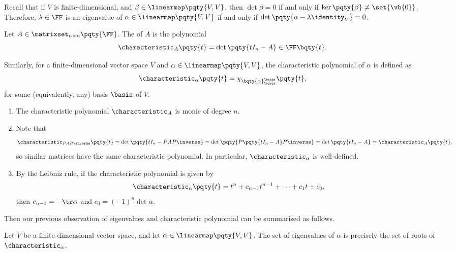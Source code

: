 Recall that if \(V\) is finite-dimensional, and \(\beta \in \linearmap\pqty{V, V}\), then \(\det \beta = 0\) if and only if \(\ker \pqty{\beta} \neq \set{\vb{0}}\). Therefore, \(\lambda \in \FF\) is an eigenvalue of \(\alpha \in \linearmap\pqty{V, V}\) if and only if \(\det\pqty{\alpha - \lambda \identity_V} = 0\).

\begin{definition}
    Let \(A \in \matrixset_{n \times n} \pqty{\FF}\). The  of \(A\) is the polynomial
    \[
        \characteristic_{A} \pqty{t} = \det\pqty{t I_n - A} \in \FF\bqty{t}.
    \]
    
    Similarly, for a finite-dimensional vector space \(V\) and \(\alpha \in \linearmap\pqty{V, V}\), the characteristic polynomial of \(\alpha\) is defined as
    \[
        \characteristic_{\alpha} \pqty{t} = \chi_{\bqty{\alpha}_{\basis}^{\basis}} \pqty{t},
    \]
    for some (equivalently, any) basis \(\basis\) of \(V\).
\end{definition}

\begin{remark}
    \begin{enumerate}[label=(\roman*)]
        \item The characteristic polynomial \(\characteristic_{A}\) is monic of degree \(n\).
        \item Note that
        \[
            \characteristic_{P A P\inverse} \pqty{t} = \det\pqty{t I_n - P A P\inverse} = \det\pqty{P\pqty{t I_n - A}P\inverse} = \det\pqty{t I_n - A} = \characteristic_{A}\pqty{t},
        \]
        so similar matrices have the same characteristic polynomial. In particular, \(\characteristic_{\alpha}\) is well-defined.
        \item By the Leibniz rule, if the characteristic polynomial is given by
        \[
            \characteristic_{\alpha} \pqty{t} = t^n + c_{n - 1} t^{n - 1} + \cdots + c_1 t + c_0,
        \]
        then \(c_{n - 1} = -\tr \alpha\) and \(c_0 = (-1)^n \det \alpha\).
    \end{enumerate}
\end{remark}

Then our previous observation of eigenvalues and characteristic polynomial can be summarised as follows.

\begin{lemma}
    Let \(V\) be a finite-dimensional vector space, and let \(\alpha \in \linearmap\pqty{V, V}\). The set of eigenvalues of \(\alpha\) is precisely the set of roots of \(\characteristic_{\alpha}\).
\end{lemma}

